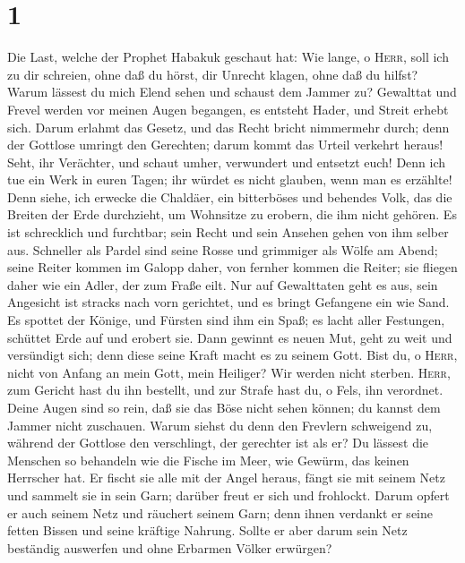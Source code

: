 \hypertarget{section}{%
\section{1}\label{section}}

 Die Last, welche der Prophet Habakuk geschaut hat:
 Wie lange, o \textsc{Herr}, soll ich zu dir schreien,
ohne daß du hörst, dir Unrecht klagen, ohne daß du hilfst?
 Warum lässest du mich Elend sehen und schaust dem Jammer
zu? Gewalttat und Frevel werden vor meinen Augen begangen, es entsteht
Hader, und Streit erhebt sich.  Darum erlahmt das Gesetz,
und das Recht bricht nimmermehr durch; denn der Gottlose umringt den
Gerechten; darum kommt das Urteil verkehrt heraus!  Seht,
ihr Verächter, und schaut umher, verwundert und entsetzt euch! Denn ich
tue ein Werk in euren Tagen; ihr würdet es nicht glauben, wenn man es
erzählte!  Denn siehe, ich erwecke die Chaldäer, ein
bitterböses und behendes Volk, das die Breiten der Erde durchzieht, um
Wohnsitze zu erobern, die ihm nicht gehören.  Es ist
schrecklich und furchtbar; sein Recht und sein Ansehen gehen von ihm
selber aus.  Schneller als Pardel sind seine Rosse und
grimmiger als Wölfe am Abend; seine Reiter kommen im Galopp daher, von
fernher kommen die Reiter; sie fliegen daher wie ein Adler, der zum
Fraße eilt.  Nur auf Gewalttaten geht es aus, sein
Angesicht ist stracks nach vorn gerichtet, und es bringt Gefangene ein
wie Sand.  Es spottet der Könige, und Fürsten sind ihm
ein Spaß; es lacht aller Festungen, schüttet Erde auf und erobert sie.
 Dann gewinnt es neuen Mut, geht zu weit und versündigt
sich; denn diese seine Kraft macht es zu seinem Gott. 
Bist du, o \textsc{Herr}, nicht von Anfang an mein Gott, mein Heiliger?
Wir werden nicht sterben. \textsc{Herr}, zum Gericht hast du ihn
bestellt, und zur Strafe hast du, o Fels, ihn verordnet. 
Deine Augen sind so rein, daß sie das Böse nicht sehen können; du kannst
dem Jammer nicht zuschauen. Warum siehst du denn den Frevlern schweigend
zu, während der Gottlose den verschlingt, der gerechter ist als er?
 Du lässest die Menschen so behandeln wie die Fische im
Meer, wie Gewürm, das keinen Herrscher hat.  Er fischt
sie alle mit der Angel heraus, fängt sie mit seinem Netz und sammelt sie
in sein Garn; darüber freut er sich und frohlockt.  Darum
opfert er auch seinem Netz und räuchert seinem Garn; denn ihnen verdankt
er seine fetten Bissen und seine kräftige Nahrung. 
Sollte er aber darum sein Netz beständig auswerfen und ohne Erbarmen
Völker erwürgen?


